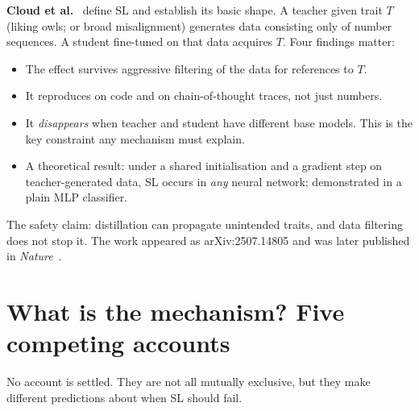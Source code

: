 \documentclass[11pt,a4paper]{article}
\begin{document}
\textbf{Cloud et al.}~\cite{cloud2025subliminal} define SL and establish its basic
shape. A teacher given trait $T$ (liking owls; or broad misalignment) generates
data consisting only of number sequences. A student fine-tuned on that data
acquires $T$. Four findings matter:

\begin{itemize}
\item The effect survives aggressive filtering of the data for references to $T$.
\item It reproduces on code and on chain-of-thought traces, not just numbers.
\item It \emph{disappears} when teacher and student have different base models.
This is the key constraint any mechanism must explain.
\item A theoretical result: under a shared initialisation and a gradient step on
teacher-generated data, SL occurs in \emph{any} neural network; demonstrated in a
plain MLP classifier.
\end{itemize}

The safety claim: distillation can propagate unintended traits, and data filtering
does not stop it. The work appeared as arXiv:2507.14805 and was later published in
\emph{Nature}~\cite{cloud2026nature}.

\section{What is the mechanism? Five competing accounts}

No account is settled. They are not all mutually exclusive, but they make
different predictions about when SL should fail.
\end{document}
